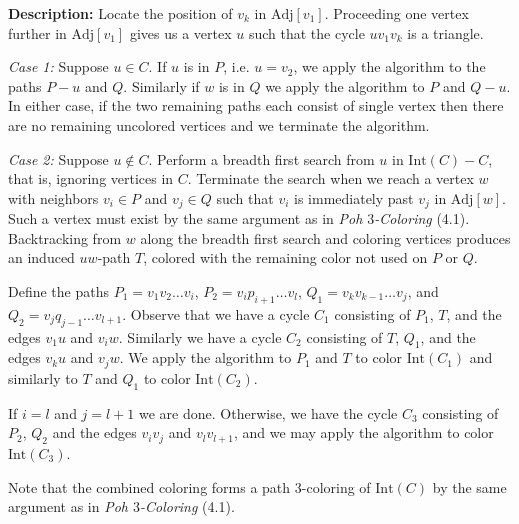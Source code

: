 \documentclass[letterpaper, 12pt]{article}
\theoremstyle{thm}
\begin{document}
\noindent\textbf{Description:} Locate the position of $v_k$ in
$\text{Adj}[v_1]$. Proceeding one vertex further in $\text{Adj}[v_1]$ gives us a
vertex $u$ such that the cycle $uv_1v_k$ is a triangle.

\textit{Case 1:} Suppose $u\in C$. If $u$ is in $P$, i.e. $u=v_2$, we apply the
algorithm to the paths $P-u$ and $Q$. Similarly if $w$ is in $Q$ we apply the
algorithm to $P$ and $Q-u$. In either case, if the two remaining paths each
consist of single vertex then there are no remaining uncolored vertices and we
terminate the algorithm.

\textit{Case 2:} Suppose $u\not\in C$. Perform a breadth first search from $u$
in $\text{Int}(C)-C$, that is, ignoring vertices in $C$. Terminate the search
when we reach a vertex
$w$ with neighbors $v_i\in P$ and $v_j \in Q$ such that $v_i$ is immediately
past $v_j$ in $\text{Adj}[w]$. Such a vertex must exist by the same argument
as in \textit{Poh $3$-Coloring} (4.1).
Backtracking from $w$ along the breadth first search and coloring vertices
produces an induced $uw$-path $T$, colored with the remaining color not used on
$P$ or $Q$.

Define the paths $P_1=v_1v_2\ldots v_i$, $P_2=v_ip_{i+1}\ldots v_l$,
$Q_1=v_kv_{k-1}\ldots v_j$, and $Q_2=v_jq_{j-1}\ldots v_{l+1}$. Observe that we
have a cycle $C_1$ consisting of $P_1$, $T$, and the edges $v_1u$ and $v_iw$.
Similarly we have a cycle $C_2$ consisting of $T$, $Q_1$, and the edges $v_ku$
and $v_jw$. We apply the algorithm to $P_1$ and $T$ to color $\text{Int}(C_1)$
and similarly to $T$ and $Q_1$ to color $\text{Int}(C_2)$.

If $i=l$ and
$j=l+1$ we are done. Otherwise, we have the cycle $C_3$ consisting of $P_2$,
$Q_2$ and the edges $v_iv_j$ and $v_lv_{l+1}$, and we may apply the algorithm to
color $\text{Int}(C_3)$.

Note that the combined coloring forms a path $3$-coloring of $\text{Int}(C)$ by the
same argument as in \textit{Poh $3$-Coloring} (4.1).
\end{document}
